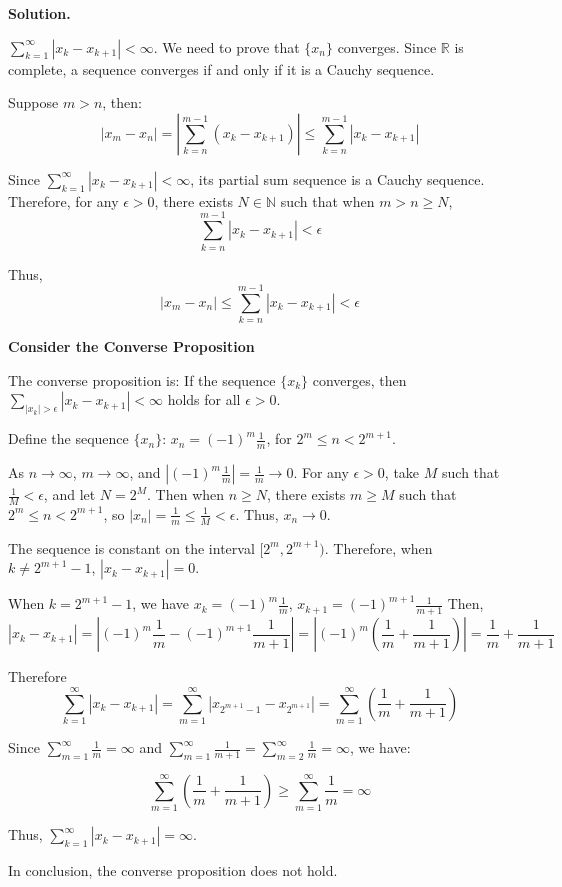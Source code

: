 \documentclass[12pt, a4paper, oneside]{ctexart}
\newenvironment{solution}{\par\noindent\textbf{Solution. }}{\par}
\begin{document}
\begin{solution}


$\sum_{k = 1}^{\infty}|x_k - x_{k + 1}| < \infty$. We need to prove that $\{x_n\}$ converges. Since $\mathbb{R}$ is complete, a sequence converges if and only if it is a Cauchy sequence. 

Suppose $m > n$, then:
$$
|x_m - x_n|=\left|\sum_{k = n}^{m - 1}(x_k - x_{k + 1})\right|\leq\sum_{k = n}^{m - 1}|x_k - x_{k + 1}|
$$

Since $\sum_{k = 1}^{\infty}|x_k - x_{k + 1}|<\infty$, its partial sum sequence is a Cauchy sequence. Therefore, for any $\epsilon > 0$, there exists $N\in\mathbb{N}$ such that when $m > n\geq N$,
$$
\sum_{k = n}^{m - 1}|x_k - x_{k + 1}|<\epsilon
$$

Thus,
$$
|x_m - x_n|\leq\sum_{k = n}^{m - 1}|x_k - x_{k + 1}|<\epsilon
$$

\textbf{Consider the Converse Proposition} 

The converse proposition is: If the sequence $ \{x_k\} $ converges, then $ \sum_{|x_k| > \epsilon} |x_k - x_{k + 1}| < \infty $ holds for all $ \epsilon > 0 $.

Define the sequence $\{x_n\}$: $x_n = (- 1)^m\frac{1}{m}$, for $2^m\leq n < 2^{m + 1}$.

As $n\to\infty$, $m\to\infty$, and $|(- 1)^m\frac{1}{m}|=\frac{1}{m}\to0$. For any $\epsilon>0$, take $M$ such that $\frac{1}{M}<\epsilon$, and let $N = 2^M$. Then when $n\geq N$, there exists $m\geq M$ such that $2^m\leq n < 2^{m + 1}$, so $|x_n| = \frac{1}{m}\leq\frac{1}{M}<\epsilon$. Thus, $x_n\to0$.

The sequence is constant on the interval $[2^m, 2^{m + 1})$. Therefore, when $k\neq 2^{m + 1}-1$, $|x_k - x_{k + 1}| = 0$. 

When $k = 2^{m + 1}-1$, we have $x_k = (- 1)^m\frac{1}{m}$, $x_{k + 1}=(- 1)^{m + 1}\frac{1}{m + 1}$
Then,
$$
|x_k - x_{k + 1}|=\left|(- 1)^m\frac{1}{m}-(- 1)^{m + 1}\frac{1}{m + 1}\right|=\left|(- 1)^m\left(\frac{1}{m}+\frac{1}{m + 1}\right)\right|=\frac{1}{m}+\frac{1}{m + 1}
$$

Therefore
$$
\sum_{k = 1}^{\infty}|x_k - x_{k + 1}|=\sum_{m = 1}^{\infty}|x_{2^{m + 1}-1}-x_{2^{m + 1}}|=\sum_{m = 1}^{\infty}\left(\frac{1}{m}+\frac{1}{m + 1}\right)
$$

Since $\sum_{m = 1}^{\infty}\frac{1}{m}=\infty$ and $\sum_{m = 1}^{\infty}\frac{1}{m + 1}=\sum_{m = 2}^{\infty}\frac{1}{m}=\infty$, we have:

$$
\sum_{m = 1}^{\infty}\left(\frac{1}{m}+\frac{1}{m + 1}\right)\geq\sum_{m = 1}^{\infty}\frac{1}{m}=\infty
$$

Thus, $\sum_{k = 1}^{\infty}|x_k - x_{k + 1}|=\infty$.

In conclusion, the converse proposition does not hold.

\end{solution}
\end{document}
